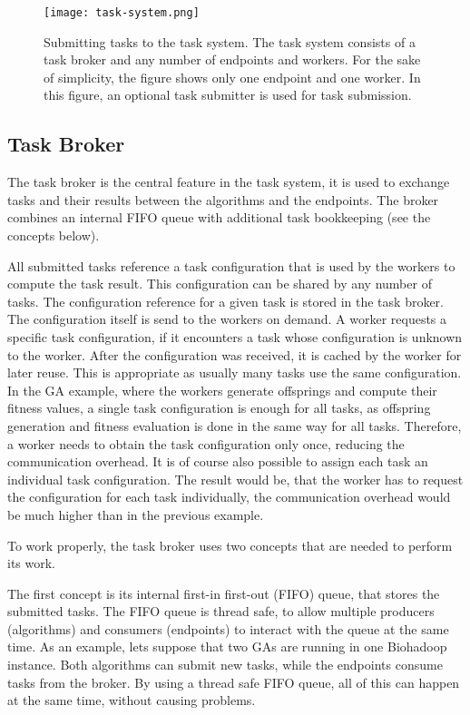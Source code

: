 \begin{figure}[ht!]
  \centering
  \texttt{[image: task-system.png]}
  \caption{Submitting tasks to the task system. The task system consists of a task broker and any number of endpoints and workers. For the sake of simplicity, the figure shows only one endpoint and one worker. In this figure, an optional task submitter is used for task submission.}
  \label{fig:task-system}
\end{figure}

\subsection{Task Broker}
The task broker is the central feature in the task system, it is used to exchange tasks and their results between the algorithms and the endpoints. The broker combines an internal FIFO queue with additional task bookkeeping (see the concepts below).

All submitted tasks reference a task configuration that is used by the workers to compute the task result. This configuration can be shared by any number of tasks. The configuration reference for a given task is stored in the task broker. The configuration itself is send to the workers on demand. A worker requests a specific task configuration, if it encounters a task whose configuration is unknown to the worker. After the configuration was received, it is cached by the worker for later reuse. This is appropriate as usually many tasks use the same configuration. In the GA example, where the workers generate offsprings and compute their fitness values, a single task configuration is enough for all tasks, as offspring generation and fitness evaluation is done in the same way for all tasks. Therefore, a worker needs to obtain the task configuration only once, reducing the communication overhead. It is of course also possible to assign each task an individual task configuration. The result would be, that the worker has to request the configuration for each task individually, the communication overhead would be much higher than in the previous example.

To work properly, the task broker uses two concepts that are needed to perform its work. 

The first concept is its internal first-in first-out (FIFO) queue, that stores the submitted tasks. The FIFO queue is thread safe, to allow multiple producers (algorithms) and consumers (endpoints) to interact with the queue at the same time. As an example, lets suppose that two GAs are running in one Biohadoop instance. Both algorithms can submit new tasks, while the endpoints consume tasks from the broker. By using a thread safe FIFO queue, all of this can happen at the same time, without causing problems.

